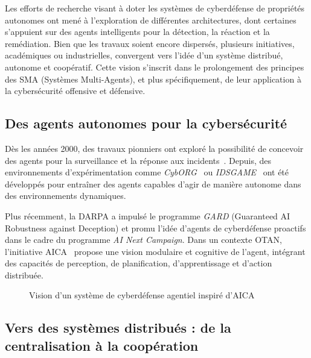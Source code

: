 \documentclass[ twoside,openright,titlepage,numbers=noenddot,headinclude,%
                footinclude=true,cleardoublepage=empty,abstractoff, %
                BCOR=5mm,paper=a4,fontsize=11pt,%
                french,american,%
                ]{scrreprt}
\begin{document}
Les efforts de recherche visant à doter les systèmes de cyberdéfense de propriétés autonomes ont mené à l'exploration de différentes architectures, dont certaines s'appuient sur des agents intelligents pour la détection, la réaction et la remédiation. Bien que les travaux soient encore dispersés, plusieurs initiatives, académiques ou industrielles, convergent vers l'idée d'un système distribué, autonome et coopératif. Cette vision s'inscrit dans le prolongement des principes des SMA (Systèmes Multi-Agents), et plus spécifiquement, de leur application à la cybersécurité offensive et défensive.

\subsection*{Des agents autonomes pour la cybersécurité}

Dès les années 2000, des travaux pionniers ont exploré la possibilité de concevoir des agents pour la surveillance et la réponse aux incidents~\cite{Jansen2000}. Depuis, des environnements d'expérimentation comme \emph{CybORG}~\cite{Mature2021} ou \emph{IDSGAME}~\cite{Shamshirband2020} ont été développés pour entraîner des agents capables d'agir de manière autonome dans des environnements dynamiques.

Plus récemment, la DARPA a impulsé le programme \emph{GARD} (Guaranteed AI Robustness against Deception) et promu l'idée d'agents de cyberdéfense proactifs dans le cadre du programme \emph{AI Next Campaign}. Dans un contexte OTAN, l'initiative AICA~\cite{AICAReport2021, AICAGuide2022} propose une vision modulaire et cognitive de l'agent, intégrant des capacités de perception, de planification, d'apprentissage et d'action distribuée.

\begin{figure}[H]
    \centering
    \caption{Vision d'un système de cyberdéfense agentiel inspiré d'AICA}
    \label{fig:agent_architecture}
\end{figure}

\subsection*{Vers des systèmes distribués : de la centralisation à la coopération}
\end{document}
